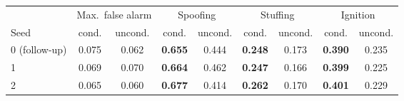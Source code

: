 \begin{tabular}{lcccccccc}
\toprule
& \multicolumn{2}{c}{Max.\ false alarm} & \multicolumn{2}{c}{Spoofing} & \multicolumn{2}{c}{Stuffing} & \multicolumn{2}{c}{Ignition} \\
\cmidrule(lr){2-3}\cmidrule(lr){4-5}\cmidrule(lr){6-7}\cmidrule(lr){8-9}
Seed & cond. & uncond. & cond. & uncond. & cond. & uncond. & cond. & uncond. \\
\midrule
0 (follow-up) & 0.075 & 0.062 & \textbf{0.655} & 0.444 & \textbf{0.248} & 0.173 & \textbf{0.390} & 0.235 \\
1 & 0.069 & 0.070 & \textbf{0.664} & 0.462 & \textbf{0.247} & 0.166 & \textbf{0.399} & 0.225 \\
2 & 0.065 & 0.060 & \textbf{0.677} & 0.414 & \textbf{0.262} & 0.170 & \textbf{0.401} & 0.229 \\
\bottomrule
\end{tabular}
